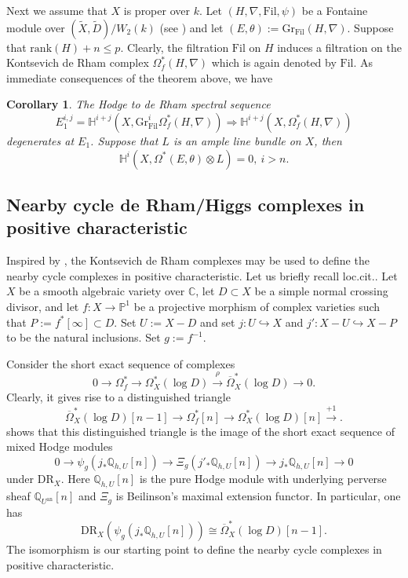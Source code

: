 \documentclass[12pt, a4paper]{article}
\newtheorem{corollary}{Corollary}[section]
\begin{document}
Next we assume that $X$ is proper over $k$. Let $(H,\nabla,\mathrm{Fil},\psi)$ be a Fontaine module over $(\tilde X,\tilde D)/W_2(k)$ (see \cite[Definition 4.16]{OV}) and let $(E,\theta):=\mathrm{Gr}_\mathrm{Fil}(H,\nabla)$. Suppose that $\mathrm{rank}(H)+n\leq p$. Clearly, the filtration $\mathrm{Fil}$ on $H$ induces a filtration on the Kontsevich de Rham complex $\Omega_f^*(H,\nabla)$ which is again denoted by $\mathrm{Fil}$. As immediate consequences of the theorem above, we have 
\begin{corollary}
 The Hodge to de Rham spectral sequence 
 $$
 E_1^{i,j}=\mathbb H^{i+j}(X,\mathrm{Gr}^i_\mathrm{Fil}\Omega^*_f(H,\nabla))\Rightarrow\mathbb H^{i+j}(X,\Omega^*_f(H,\nabla))
 $$
 degenerates at $E_1$. Suppose that $L$ is an ample line bundle on $X$, then
 $$
 \mathbb H^i(X,\Omega^*(E,\theta)\otimes L)=0,~i>n.
 $$
\end{corollary}
\subsection{Nearby cycle de Rham/Higgs complexes in positive characteristic}
Inspired by \cite[Appendix E]{ESY}, the Kontsevich de Rham complexes may be used to define the nearby cycle complexes in positive characteristic. Let us briefly recall loc.cit.. 
Let $X$ be a smooth algebraic variety over $\mathbb C$, let $D\subset X$ be a simple normal crossing divisor, and let $f:X\to\mathbb P^1$ be a projective morphism of complex varieties such that $P:=f^*[\infty]\subset D$. Set $U:=X-D$ and set $j:U\hookrightarrow X$ and $j':X-U\hookrightarrow X-P$ to be the natural inclusions. Set $g:=f^{-1}$.

Consider the short exact sequence of complexes
$$
0\to\Omega^*_f\to\Omega^*_X(\log D)\xrightarrow{\rho}\overline{\Omega}^*_X(\log D)\to 0.
$$
Clearly, it gives rise to a distinguished triangle 
$$
\overline{\Omega}^*_X(\log D)[n-1]\to\Omega^*_f[n]\to\Omega^*_X(\log D)[n]\xrightarrow{+1}.
$$
\cite[Theorem E.3]{ESY} shows that this distinguished triangle is the image of the short exact sequence of mixed Hodge modules
$$
0\to\psi_g
(j_*\mathbb Q_{h,U}[n])\to\Xi_g(j'_*\mathbb Q_{h,U}[n])\to j_*\mathbb Q_{h,U}[n]\to0
$$
under $\mathrm{DR}_X$. Here $\mathbb Q_{h,U}[n]$ is the pure Hodge module with underlying perverse sheaf $\mathbb Q_{U^\mathrm{an}}[n]$ and $\Xi_g$ is Beilinson's maximal extension functor. In particular, one has
$$
\mathrm{DR}_X(\psi_g(j_*\mathbb Q_{h,U}[n]))\cong\overline{\Omega}^*_X(\log D)[n-1].
$$
The isomorphism is our starting point to define the nearby cycle complexes in positive  characteristic.
\end{document}
